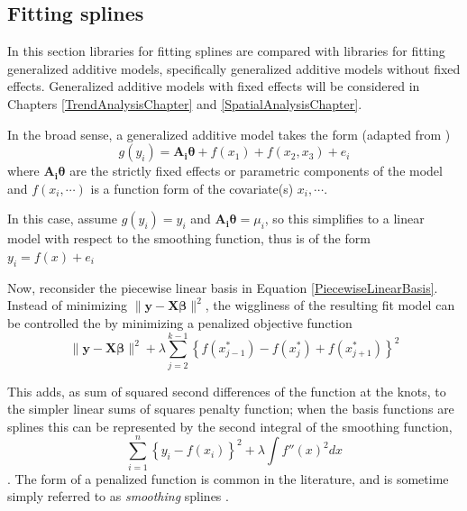 \documentclass[phdcss]{SDSUThesis}
\begin{document}
\subsection{Fitting splines}

In this section libraries for fitting splines are compared with libraries for fitting generalized additive models, specifically generalized additive models without fixed effects. Generalized additive models with fixed effects will be considered in Chapters \ref{TrendAnalysisChapter} and \ref{SpatialAnalysisChapter}.

In the broad sense, a generalized additive model takes the form (adapted from \cite{wood-2017})
\begin{equation}\label{GAMFormula}
g(y_i) = \mathbf{A_i} \mathbf{\theta} + f(x_{1}) + f(x_2, x_3) + e_i
\end{equation}
where $\mathbf{A_i} \mathbf{\theta}$ are the strictly fixed effects or parametric components of the model and  $f(x_i,\cdots)$ is a function form of the covariate(s) $x_i, \cdots$. 

In this case, assume $g(y_i)=y_i$ and $\mathbf{A_i} \mathbf{\theta} = \mu_i$, so this simplifies to a linear model with respect to the smoothing function, thus is of the form $y_i = f(x) + e_i$

Now, reconsider the piecewise linear basis in Equation \ref{PiecewiseLinearBasis}. Instead of minimizing $\lVert\mathbf{y} - \mathbf{X} \mathbf{\beta} \rVert ^2$, the wiggliness of the resulting fit model can be controlled the by minimizing a penalized objective function \cite{wood-2017}
\begin{equation}\label{PiecewisePenalized}
   \lVert\mathbf{y} - \mathbf{X} \mathbf{\beta} \rVert ^2 + \lambda \sum_{j=2}^{k-1} \left\{f(x^*_{j-1})-f(x^*_j) + f(x^*_{j+1})  \right\}^2
\end{equation}

This adds, as sum of squared second differences of the function at the knots, to the simpler linear sums of squares penalty function; when the basis functions are splines this can be represented by the second integral of the smoothing function,
\begin{equation}\label{SmoothingSplinePenalty}
   \sum_{i=1}^n\left\{ y_i -f(x_i) \right\}^2 + \lambda \int f''(x)^2 dx
\end{equation}.
The form of a penalized function is common in the literature, and is sometime simply referred to as \textit{smoothing} splines \cite{hastie-2010}. 
\end{document}
